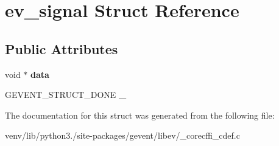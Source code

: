 \hypertarget{structev__signal}{}\section{ev\+\_\+signal Struct Reference}
\label{structev__signal}
\subsection*{Public Attributes}
\begin{DoxyCompactItemize}
\item 
\mbox{\label{structev__signal_a4dd58476d0d27e9e45c14d8447e1aca1}} 
void $\ast$ {\bfseries data}
\item 
\mbox{\label{structev__signal_ac628bbda1de761febaa4b364775f65a0}} 
G\+E\+V\+E\+N\+T\+\_\+\+S\+T\+R\+U\+C\+T\+\_\+\+D\+O\+NE {\bfseries \+\_\+}
\end{DoxyCompactItemize}


The documentation for this struct was generated from the following file\+:\begin{DoxyCompactItemize}
\item 
venv/lib/python3./site-\/packages/gevent/libev/\+\_\+corecffi\+\_\+cdef.\+c\end{DoxyCompactItemize}

